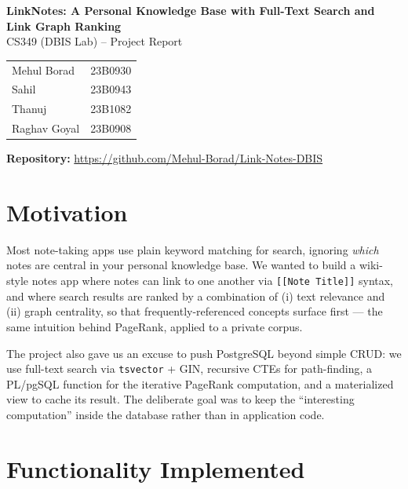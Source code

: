 \documentclass[11pt,a4paper]{article}
\begin{document}
\begin{center}
{\Large\bfseries LinkNotes: A Personal Knowledge Base with Full-Text Search and Link Graph Ranking}\\[0.4em]
{\large CS349 (DBIS Lab) -- Project Report}\\[0.8em]
\end{center}

\begin{center}
\begin{tabular}{ll}
Mehul Borad & 23B0930 \\
Sahil & 23B0943 \\
Thanuj & 23B1082 \\
Raghav Goyal & 23B0908 \\
\end{tabular}
\end{center}

\begin{center}
\textbf{Repository:} \url{https://github.com/Mehul-Borad/Link-Notes-DBIS}
\end{center}

\vspace{0.3em}

\section{Motivation}

Most note-taking apps use plain keyword matching for search, ignoring \emph{which} notes are central in your personal knowledge base. We wanted to build a wiki-style notes app where notes can link to one another via \texttt{[[Note Title]]} syntax, and where search results are ranked by a combination of (i) text relevance and (ii) graph centrality, so that frequently-referenced concepts surface first --- the same intuition behind PageRank, applied to a private corpus.

The project also gave us an excuse to push PostgreSQL beyond simple CRUD: we use full-text search via \texttt{tsvector} + GIN, recursive CTEs for path-finding, a PL/pgSQL function for the iterative PageRank computation, and a materialized view to cache its result. The deliberate goal was to keep the ``interesting computation'' inside the database rather than in application code.

\section{Functionality Implemented}
\end{document}
